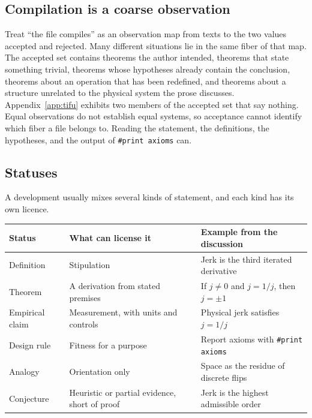 \documentclass[11pt]{article}
\begin{document}
\subsection{Compilation is a coarse observation}

Treat ``the file compiles'' as an observation map from texts to the two values accepted and rejected. Many different situations lie in the same fiber of that map. The accepted set contains theorems the author intended, theorems that state something trivial, theorems whose hypotheses already contain the conclusion, theorems about an operation that has been redefined, and theorems about a structure unrelated to the physical system the prose discusses. Appendix~\ref{app:tifu} exhibits two members of the accepted set that say nothing. Equal observations do not establish equal systems, so acceptance cannot identify which fiber a file belongs to. Reading the statement, the definitions, the hypotheses, and the output of \texttt{\#print axioms} can.

\subsection{Statuses}

A development usually mixes several kinds of statement, and each kind has its own licence.

\begin{center}
\small
\begin{tabular}{@{}>{\raggedright\arraybackslash}p{}>{\raggedright\arraybackslash}p{}>{\raggedright\arraybackslash}p{}@{}}
\toprule
Status & What can license it & Example from the discussion \\
\midrule
Definition & Stipulation & Jerk is the third iterated derivative \\
Theorem & A derivation from stated premises & If $j\neq0$ and $j=1/j$, then $j=\pm1$ \\
Empirical claim & Measurement, with units and controls & Physical jerk satisfies $j=1/j$ \\
Design rule & Fitness for a purpose & Report axioms with \texttt{\#print axioms} \\
Analogy & Orientation only & Space as the residue of discrete flips \\
Conjecture & Heuristic or partial evidence, short of proof & Jerk is the highest admissible order \\
\bottomrule
\end{tabular}
\end{center}
\end{document}
